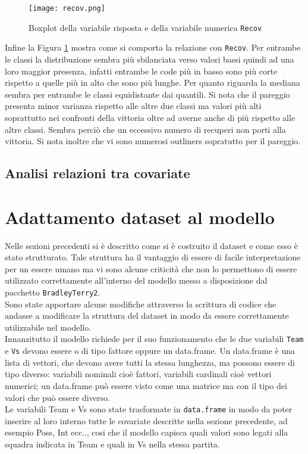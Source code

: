 \begin{figure}[htbp]
	\begin{center}
		\texttt{[image: recov.png]}
		\caption{Boxplot della variabile risposta e della variabile numerica \texttt{Recov}} \label{fig:recov}
	\end{center}
\end{figure} 

Infine la Figura \ref{fig:recov} mostra come si comporta la relazione con \texttt{Recov}. Per entrambe le classi la distribuzione sembra più sbilanciata verso valori bassi quindi ad una loro maggior presenza, infatti entrambe le code più in basso sono più corte rispetto a quelle più in alto che sono più lunghe. Per quanto riguarda la mediana sembra per entrambe le classi equidistante dai quantili. Si nota che il pareggio presenta minor varianza rispetto alle altre due classi ma valori più alti soprattutto nei confronti della vittoria oltre ad averne anche di più rispetto alle altre classi. Sembra perciò che un eccessivo numero di recuperi non porti alla vittoria. Si nota inoltre che vi sono numerosi outliners sopratutto per il pareggio.

\subsection{Analisi relazioni tra covariate} 
\pagebreak
\section{Adattamento dataset al modello}

Nelle sezioni precedenti si è descritto come si è costruito il dataset e come esso è stato strutturato. Tale struttura ha il vantaggio di essere di facile interpretazione per un essere umano ma vi sono alcune criticità che non lo permettono di essere utilizzato correttamente all'interno del modello messo a disposizione dal pacchetto \texttt{BradleyTerry2}.\\ 
Sono state apportare alcune modifiche attraverso la scrittura di codice che andasse a modificare la struttura del dataset in modo da essere correttamente utilizzabile nel modello. \\

Innanzitutto il modello richiede per il suo funzionamento che le due variabili \texttt{Team} e \texttt{Vs} devono essere o di tipo fattore oppure un \textsf{data.frame}. Un \textsf{data.frame} è una lista di vettori, che devono avere tutti la stessa lunghezza, ma possono essere di tipo diverso: variabili nominali cioè fattori, variabili cardinali cioè vettori numerici; un \textsf{data.frame} può essere visto come una matrice ma con il tipo dei valori che può essere diverso.\\ 
Le variabili \textsf{Team} e \textsf{Vs} sono state trasformate in \texttt{data.frame} in modo da poter inserire al loro interno tutte le covariate descritte nella sezione precedente, ad esempio \textsf{Poss}, \textsf{Int} ecc.., cosi che il modello capisca quali valori sono legati alla squadra indicata in \textsf{Team} e quali in \textsf{Vs} nella stessa partita.\\

